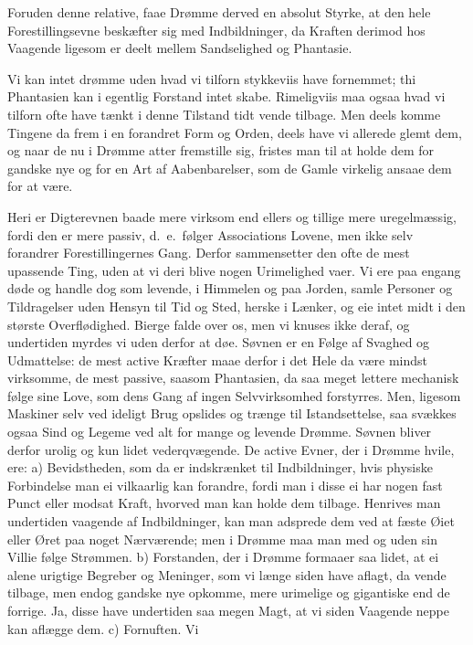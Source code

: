 \documentclass[12pt,a4paper]{article}
\newcommand{\opage}[1]{\marginnote{\footnotesize\textit{[#1]}}}
\begin{document}
Foruden denne relative, faae Drømme derved en absolut Styrke, at den hele
Forestillingsevne beskæfter sig med Indbildninger, da Kraften derimod hos Vaagende
ligesom er deelt mellem Sandselighed og Phantasie.

Vi kan intet drømme uden hvad vi tilforn stykkeviis have fornemmet; thi Phantasien kan i
egentlig Forstand intet skabe. Rimeligviis maa ogsaa hvad vi tilforn ofte have tænkt i
denne Tilstand tidt vende tilbage. Men deels komme Tingene da frem i en forandret Form og
Orden, deels have vi allerede glemt dem, og naar
\opage{128} de nu i Drømme atter fremstille sig, fristes man til at holde dem for gandske nye og for
en Art af Aabenbarelser, som de Gamle virkelig ansaae dem for at være.

Heri er Digterevnen baade mere virksom end ellers og tillige mere uregelmæssig, fordi den
er mere passiv, d.~e.\ følger Associations Lovene, men ikke selv forandrer
Forestillingernes Gang. Derfor sammensetter den ofte de mest upassende Ting, uden at vi
deri blive nogen Urimelighed vaer. Vi ere paa engang døde og handle dog som levende, i
Himmelen og paa Jorden, samle Personer og Tildragelser uden Hensyn til Tid og Sted,
herske i Lænker, og eie intet midt i den største Overflødighed. Bierge falde over os, men
vi knuses ikke deraf, og undertiden myrdes vi uden derfor at døe. Søvnen er en Følge af
Svaghed og Udmattelse: de mest active Kræfter maae derfor i det Hele da være mindst
virksomme, de mest passive, saasom Phantasien, da saa meget lettere mechanisk følge sine
Love, som dens Gang af ingen Selvvirksomhed forstyrres. Men, ligesom Maskiner selv ved
ideligt Brug opslides og trænge til Istandsettelse, saa svækkes ogsaa Sind og Legeme ved
alt for mange og levende Drømme. Søvnen bliver derfor urolig og kun lidet vederqvægende.
De active Evner, der i Drømme hvile, ere: a) Bevidstheden, som da er indskrænket til
Indbildninger, hvis physiske Forbindelse man ei vilkaarlig kan forandre, fordi man i
disse ei har nogen fast Punct eller modsat Kraft, hvorved man kan
\opage{129} holde dem tilbage. Henrives man undertiden vaagende af Indbildninger, kan man adsprede
dem ved at fæste Øiet eller Øret paa noget Nærværende; men i Drømme maa man med og uden
sin Villie følge Strømmen. b) Forstanden, der i Drømme formaaer saa lidet, at ei alene
urigtige Begreber og Meninger, som vi længe siden have aflagt, da vende tilbage, men
endog gandske nye opkomme, mere urimelige og gigantiske end de forrige. Ja, disse have
undertiden saa megen Magt, at vi siden Vaagende neppe kan aflægge dem. c) Fornuften. Vi
\end{document}
